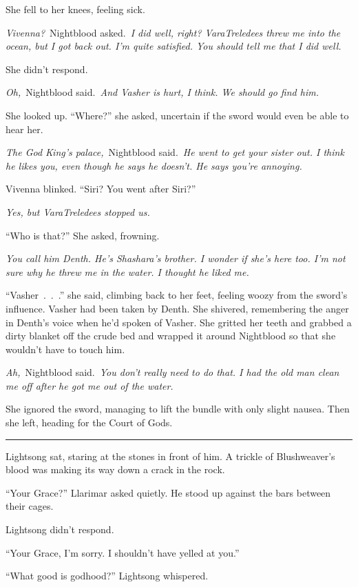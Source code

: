 She fell to her knees, feeling sick.

\textit{Vivenna?}~Nightblood asked.~\textit{I did well, right? VaraTreledees threw me into the ocean, but I got back out. I’m quite satisfied. You should tell me that I did well.}

She didn’t respond.

\textit{Oh,}~Nightblood said.~\textit{And Vasher is hurt, I think. We should go find him.}

She looked up. “Where?” she asked, uncertain if the sword would even be able to hear her.

\textit{The God King’s palace,}~Nightblood said.~\textit{He went to get your sister out. I think he likes you, even though he says he doesn’t. He says you’re annoying.}

Vivenna blinked. “Siri? You went after Siri?”

\textit{Yes, but VaraTreledees stopped us.}

“Who is that?” She asked, frowning.

\textit{You call him Denth. He’s Shashara’s brother. I wonder if she’s here too. I’m not sure why he threw me in the water. I thought he liked me.}

“Vasher~.~.~.” she said, climbing back to her feet, feeling woozy from the sword’s influence. Vasher had been taken by Denth. She shivered, remembering the anger in Denth’s voice when he’d spoken of Vasher. She gritted her teeth and grabbed a dirty blanket off the crude bed and wrapped it around Nightblood so that she wouldn’t have to touch him.

\textit{Ah,}~Nightblood said.~\textit{You don’t really need to do that. I had the old man clean me off after he got me out of the water.}

She ignored the sword, managing to lift the bundle with only slight nausea. Then she left, heading for the Court of Gods.

\bigskip \hrule \bigskip

Lightsong sat, staring at the stones in front of him. A trickle of Blushweaver’s blood was making its way down a crack in the rock.

“Your Grace?” Llarimar asked quietly. He stood up against the bars between their cages.

Lightsong didn’t respond.

“Your Grace, I’m sorry. I shouldn’t have yelled at you.”

“What good is godhood?” Lightsong whispered.

